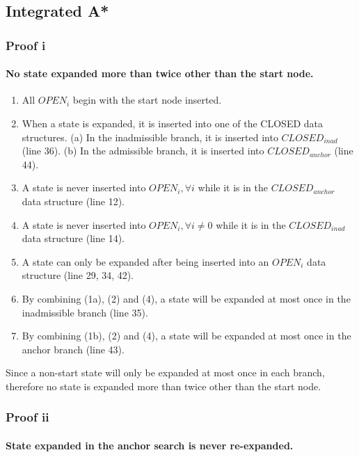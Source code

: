 \documentclass[11pt,draft]{article}
\begin{document}
\subsection{Integrated A*}
\subsubsection{Proof i}
\paragraph{No state expanded more than twice other than the start node.}
\begin{enumerate}
    \item All $OPEN_i$ begin with the start node inserted.
    \item When a state is expanded, it is inserted into one of the CLOSED data structures. (a) In the inadmissible branch, it is inserted into $CLOSED_{inad}$ (line 36). (b) In the admissible branch, it is inserted into $CLOSED_{anchor}$ (line 44).
    \item A state is never inserted into $OPEN_i, \forall i$ while it is in the $CLOSED_{anchor}$ data structure (line 12).
    \item A state is never inserted into $OPEN_i, \forall i \neq 0$ while it is in the $CLOSED_{inad}$ data structure (line 14).
    \item A state can only be expanded after being inserted into an $OPEN_i$ data structure (line 29, 34, 42).
    \item By combining (1a), (2) and (4), a state will be expanded at most once in the inadmissible branch (line 35).
    \item By combining (1b), (2) and (4), a state will be expanded at most once in the anchor branch (line 43).
\end{enumerate}
 Since a non-start state will only be expanded at most once in each branch, therefore no state is expanded more than twice other than the start node.

\subsubsection{Proof ii}
\paragraph{State expanded in the anchor search is never re-expanded.}
\end{document}
